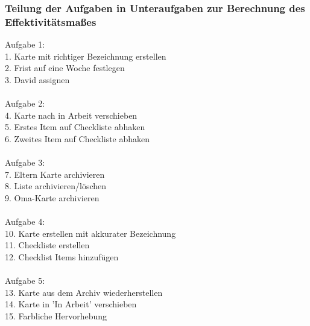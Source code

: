 



\subsubsection{Teilung der Aufgaben in Unteraufgaben zur Berechnung des Effektivitätsmaßes}

\begin{outline}[enumerate]
\newline
Aufgabe 1:\\
1. Karte mit richtiger Bezeichnung erstellen\\
2. Frist auf eine Woche festlegen\\
3. David assignen\\

\\Aufgabe 2:\\
4. Karte nach in Arbeit verschieben\\  
5. Erstes Item auf Checkliste abhaken\\
6. Zweites Item auf Checkliste abhaken\\

\\Aufgabe 3:\\
7. Eltern Karte archivieren\\  
8. Liste archivieren/löschen\\
9. Oma-Karte archivieren\\

\\Aufgabe 4:\\
10. Karte erstellen mit akkurater Bezeichnung\\
11. Checkliste erstellen\\
12. Checklist Items hinzufügen\\

\\Aufgabe 5:\\
13. Karte aus dem Archiv wiederherstellen\\
14. Karte in 'In Arbeit' verschieben\\
15. Farbliche Hervorhebung\\
\end{outline}

